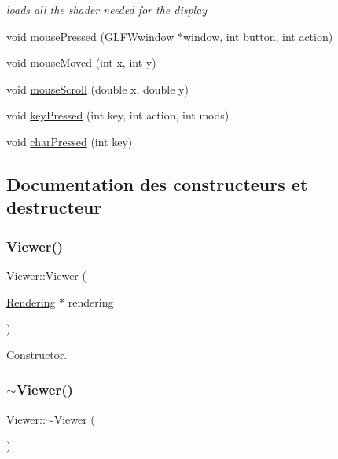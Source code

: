 \begin{DoxyCompactItemize}
\begin{DoxyCompactList}\small\item\em loads all the shader needed for the display \end{DoxyCompactList}\item 
void \hyperlink{class_viewer_ac2e3964b994ed24680586369b2b7a750}{mouse\+Pressed} (G\+L\+F\+Wwindow $\ast$window, int button, int action)
\item 
void \hyperlink{class_viewer_a5b0b70ce7a638a6bd3184ca4b4e73e4b}{mouse\+Moved} (int x, int y)
\item 
void \hyperlink{class_viewer_abd042d0aa5ae88ef0261d83c15ce8d4b}{mouse\+Scroll} (double x, double y)
\item 
void \hyperlink{class_viewer_a79192db7ddae958fc0ae2ee2e90cb995}{key\+Pressed} (int key, int action, int mods)
\item 
void \hyperlink{class_viewer_a12155081915ec2fcf3554534b8aa52d6}{char\+Pressed} (int key)
\end{DoxyCompactItemize}


\subsection{Documentation des constructeurs et destructeur}
\mbox{\label{class_viewer_a29d3e7c2922835cbd92c285c709dbe30}} 
\subsubsection{\texorpdfstring{Viewer()}{Viewer()}}
{\footnotesize\ttfamily Viewer\+::\+Viewer (\begin{DoxyParamCaption}\item[{\hyperlink{class_rendering}{Rendering} $\ast$}]{rendering }\end{DoxyParamCaption})}



Constructor. 

\mbox{\label{class_viewer_a324e5a6a1532fe5eac3f3b0e4792b2da}} 
\subsubsection{\texorpdfstring{$\sim$\+Viewer()}{~Viewer()}}
{\footnotesize\ttfamily Viewer\+::$\sim$\+Viewer (\begin{DoxyParamCaption}{ }\end{DoxyParamCaption})\hspace{0.3cm}{\ttfamily [virtual]}}



